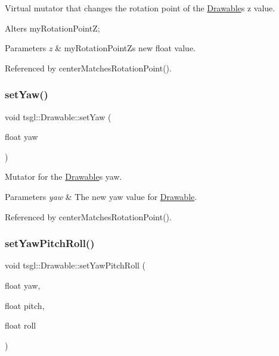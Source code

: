 Virtual mutator that changes the rotation point of the \hyperlink{classtsgl_1_1_drawable}{Drawable}\textquotesingle{}s z value. 

Alters my\+Rotation\+PointZ; 
\begin{DoxyParams}{Parameters}
{\em z} & my\+Rotation\+PointZ\textquotesingle{}s new float value. \\
\hline
\end{DoxyParams}


Referenced by center\+Matches\+Rotation\+Point().

\mbox{\label{classtsgl_1_1_drawable_aaf7dbc52fdce998927f4459e6f235111}} 
\subsubsection{\texorpdfstring{set\+Yaw()}{setYaw()}}
{\footnotesize\ttfamily void tsgl\+::\+Drawable\+::set\+Yaw (\begin{DoxyParamCaption}\item[{float}]{yaw }\end{DoxyParamCaption})\hspace{0.3cm}{\ttfamily [virtual]}}



Mutator for the \hyperlink{classtsgl_1_1_drawable}{Drawable}\textquotesingle{}s yaw. 


\begin{DoxyParams}{Parameters}
{\em yaw} & The new yaw value for \hyperlink{classtsgl_1_1_drawable}{Drawable}. \\
\hline
\end{DoxyParams}


Referenced by center\+Matches\+Rotation\+Point().

\mbox{\label{classtsgl_1_1_drawable_a127514372e6bd4b652fd384e27a944de}} 
\subsubsection{\texorpdfstring{set\+Yaw\+Pitch\+Roll()}{setYawPitchRoll()}}
{\footnotesize\ttfamily void tsgl\+::\+Drawable\+::set\+Yaw\+Pitch\+Roll (\begin{DoxyParamCaption}\item[{float}]{yaw,  }\item[{float}]{pitch,  }\item[{float}]{roll }\end{DoxyParamCaption})\hspace{0.3cm}{\ttfamily [virtual]}}



